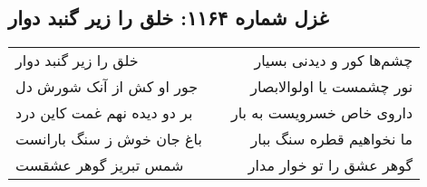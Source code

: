 \begin{center}
\section*{غزل شماره ۱۱۶۴: خلق را زیر گنبد دوار}
\label{sec:1164}
\begin{longtable}{l p{0.5cm} r}
خلق را زیر گنبد دوار
&&
چشم‌ها کور و دیدنی بسیار
\\
جور او کش از آنک شورش دل
&&
نور چشمست یا اولوالابصار
\\
بر دو دیده نهم غمت کاین درد
&&
داروی خاص خسرویست به بار
\\
باغ جان خوش ز سنگ بارانست
&&
ما نخواهیم قطره سنگ ببار
\\
شمس تبریز گوهر عشقست
&&
گوهر عشق را تو خوار مدار
\\
\end{longtable}
\end{center}
